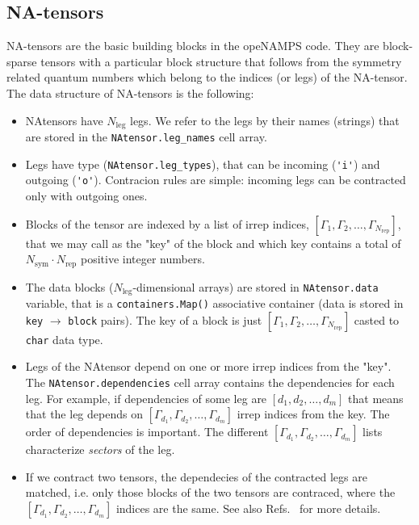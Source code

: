 \documentclass[aps,prb,twocolumn,showpacs,preprintnumbers,amsmath,amssymb, superscriptaddressm, nofootinbib]{revtex4-2}   %
\newcommand{\sym}{\mathrm{sym}}
\newcommand{\leg}{\mathrm{leg}}
\newcommand{\rep}{\mathrm{rep}}
\begin{document}
\subsection{NA-tensors}
NA-tensors are the basic building blocks in the opeNAMPS code. They are block-sparse tensors with a particular block structure that follows from the symmetry related quantum numbers which belong to the indices (or legs) of the NA-tensor. The data structure of NA-tensors is the following: 
\begin{itemize}
    \item NAtensors have $N_\leg$ legs. We refer to the legs by their names (strings) that are stored in the \verb|NAtensor.leg_names| cell array.
    \item Legs have type (\verb|NAtensor.leg_types|), that can be incoming (\verb|'i'|) and outgoing (\verb|'o'|). Contracion rules are simple: incoming legs can be contracted only with outgoing ones.
    \item Blocks of the tensor are indexed by a list of irrep indices, $[\Gamma_1, \Gamma_2, \dots, \Gamma_{N_\rep}]$, that we may call as the "key" of the block and which key contains a total of $N_\sym \cdot N_\rep$ positive integer numbers. 
    \item The data blocks ($N_\leg$-dimensional arrays) are stored in \verb|NAtensor.data| variable, that is a \verb|containers.Map()| associative container (data is stored in \verb|key| $\rightarrow$ \verb|block| pairs). The key of a block is just $[\Gamma_1, \Gamma_2, \dots, \Gamma_{N_\rep}]$ casted to \verb|char| data type.
    \item Legs of the NAtensor depend on one or more irrep indices from the "key". The \verb|NAtensor.dependencies| cell array contains the dependencies for each leg. For example, if dependencies of some leg are $[d_1, d_2, \dots, d_m]$ that means that the leg depends on $[\Gamma_{d_1}, \Gamma_{d_2}, \dots, \Gamma_{d_m}]$ irrep indices from the key. The order of dependencies is important. The different $[\Gamma_{d_1}, \Gamma_{d_2}, \dots, \Gamma_{d_m}]$ lists characterize \emph{sectors} of the leg. 
    \item If we contract two tensors, the dependecies of the contracted legs are matched, i.e. only those blocks of the two tensors are contraced, where the  $[\Gamma_{d_1}, \Gamma_{d_2}, \dots, \Gamma_{d_m}]$ indices are the same. See also Refs.~ for more details. 
\end{itemize}
\end{document}
